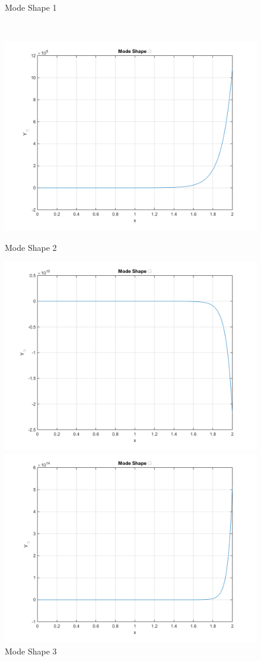 \documentclass[14pt,a4paper]{article}
\begin{document}
\begin{enumerate}
\begin{figure}[htp]
		\caption{Mode Shape 1}
	\end{figure}\\
	\begin{figure}[htp]
		\centering
		\includegraphics[scale=0.5]{hw2_VB_mode2.png}
		\caption{Mode Shape 2}
		\includegraphics[scale=0.5]{hw2_VB_mode3.png}
		\caption{Mode Shape 3}
		\includegraphics[scale=0.5]{hw2_VB_mode4.png}

\end{figure}
\end{enumerate}
\end{document}
